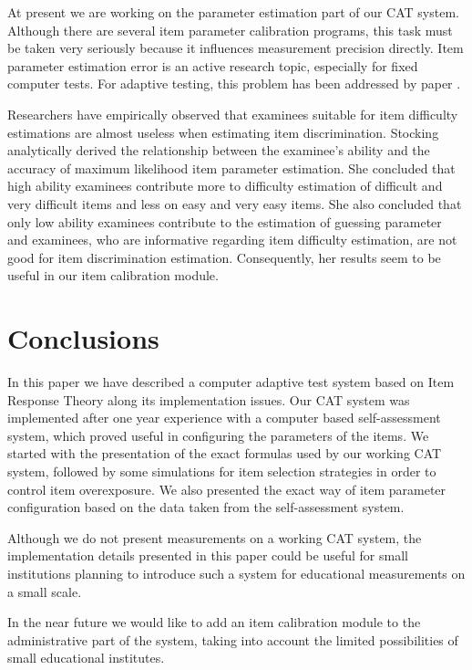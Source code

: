 \documentclass[11pt,twoside]{article}
\begin{document}
At present we are working on the parameter estimation part of our CAT system. Although there are several item parameter calibration programs, this task must be taken very seriously because it influences measurement precision directly. Item parameter estimation error is an active research topic, especially for fixed computer tests. For adaptive testing, this problem has been addressed by paper \cite{LINDENGLAS}. 

Researchers have empirically observed that examinees suitable for item difficulty estimations are almost useless when estimating item discrimination. Stocking \cite{STOCKING1990} analytically derived the relationship between the examinee's ability and the accuracy of maximum likelihood item parameter estimation. She concluded that high ability examinees contribute more to difficulty estimation of difficult and very difficult items and less on easy and very easy items. She also concluded that only low ability examinees contribute to the estimation of guessing parameter and examinees, who are informative regarding item difficulty estimation, are not good for item discrimination estimation. Consequently, her results seem to be useful in our item calibration module.

\section{Conclusions}

In this paper we have described a computer adaptive test system based on Item Response Theory along its implementation issues. Our CAT system was implemented after one year experience with a computer based self-assessment system, which proved useful in configuring the parameters of the items. We started with the presentation of the exact formulas used by our working CAT system, followed by some simulations for item selection strategies in order to control item overexposure. We also presented the exact way of item parameter configuration based on the data taken from the self-assessment system.

Although we do not present measurements on a working CAT system, the implementation details presented in this paper could be useful for small institutions planning to introduce such a system for educational measurements on a small scale.

In the near future we would like to add an item calibration module to the administrative part of the system, taking into account the limited possibilities of small educational institutes. 
\end{document}
